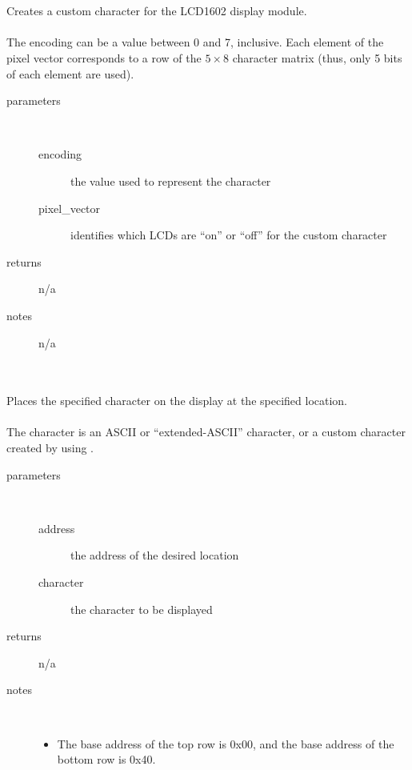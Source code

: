 \begin{itemize}
{             \\ \\
                Creates a custom character for the LCD1602 display module. \\ \\
                The encoding can be a value between 0 and 7, inclusive.
                Each element of the pixel vector corresponds to a row of the $5 \times 8$ character matrix (thus, only 5 bits of each element are used).
                \begin{description}
                    \item[parameters] \
                    \begin{description}
                        \item[encoding] the value used to represent the character
                        \item[pixel\_vector] identifies which LCDs are ``on'' or ``off'' for the custom character
                    \end{description}
                    \item[returns] n/a
                    \item[notes] n/a
                \end{description}

             \\ \\
                Places the specified character on the display at the specified location. \\ \\
                The character is an ASCII or ``extended-ASCII'' character, or a custom character created by using .
                \begin{description}
                    \item[parameters] \
                    \begin{description}
                        \item[address] the address of the desired location
                        \item[character] the character to be displayed
                    \end{description}
                    \item[returns] n/a
                    \item[notes] \
                    \begin{itemize}
                        \item The base address of the top row is 0x00, and the base address of the bottom row is 0x40.
                    \end{itemize}
                \end{description}

}
\end{itemize}

